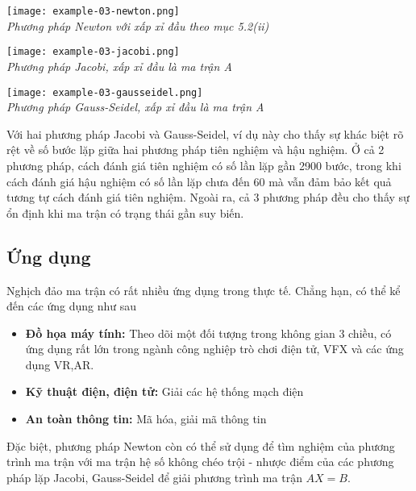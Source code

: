     \begin{center}
        \texttt{[image: example-03-newton.png]} \\
        \textit{Phương pháp Newton với xấp xỉ đầu theo mục 5.2(ii)}
        
        \texttt{[image: example-03-jacobi.png]} \\
        \textit{Phương pháp Jacobi, xấp xỉ đầu là ma trận A}
        
        \texttt{[image: example-03-gausseidel.png]} \\
        \textit{Phương pháp Gauss-Seidel, xấp xỉ đầu là ma trận A}
    \end{center}

    Với hai phương pháp Jacobi và Gauss-Seidel, ví dụ này cho thấy sự khác biệt rõ rệt về số bước lặp giữa hai phương pháp tiên nghiệm và hậu nghiệm. Ở cả 2 phương pháp, cách đánh giá tiên nghiệm có số lần lặp gần 2900 bước, trong khi cách đánh giá hậu nghiệm có số lần lặp chưa đến 60 mà vẫn đảm bảo kết quả tương tự cách đánh giá tiên nghiệm. Ngoài ra, cả 3 phương pháp đều cho thấy sự ổn định khi ma trận có trạng thái gần suy biến.

\subsection{Ứng dụng}

    Nghịch đảo ma trận có rất nhiều ứng dụng trong thực tế. Chẳng hạn, có thể kể đến các ứng dụng như sau
    \begin{itemize}
        \item \textbf{Đồ họa máy tính:} Theo dõi một đối tượng trong không gian 3 chiều, có ứng dụng rất lớn trong ngành công nghiệp trò chơi điện tử, VFX và các ứng dụng VR,AR.
        \item \textbf{Kỹ thuật điện, điện tử:} Giải các hệ thống mạch điện
        \item \textbf{An toàn thông tin:} Mã hóa, giải mã thông tin
    \end{itemize}

    Đặc biệt, phương pháp Newton còn có thể sử dụng để tìm nghiệm của phương trình ma trận với ma trận hệ số không chéo trội - nhược điểm của các phương pháp lặp Jacobi, Gauss-Seidel để giải phương trình ma trận $AX = B$.
    
